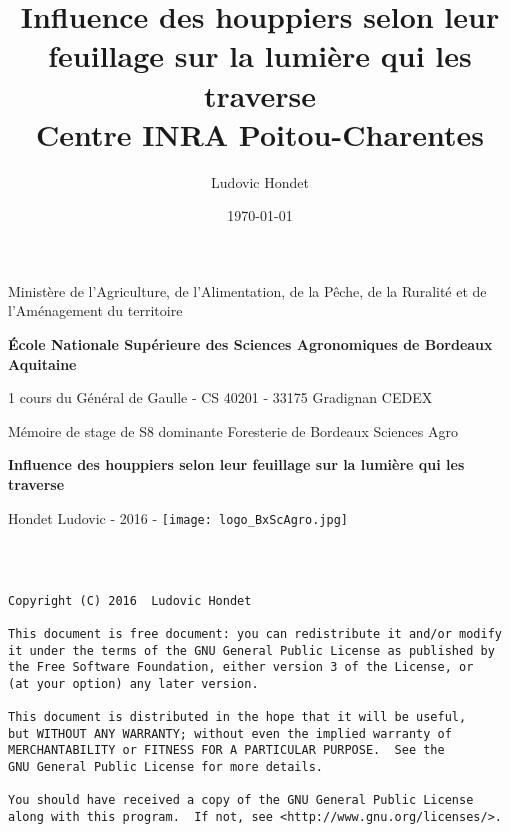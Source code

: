 ﻿\documentclass[12pt]{report}
\title{Influence des houppiers selon leur feuillage sur la lumière qui les traverse\\
\normalsize{Centre INRA Poitou-Charentes}}
\author{Ludovic Hondet}
\date{\today}
\begin{document}
\begin{titlepage}    
    \centering
    {\LARGE Ministère de l'Agriculture, de l'Alimentation,
    de la Pêche, de la Ruralité et de l'Aménagement du territoire \par}
    \vspace{6mm}
    {\huge \textbf{École Nationale Supérieure des Sciences Agronomiques de Bordeaux
    Aquitaine} \par}
    \vspace{3mm}
    {\normalsize 1 cours du Général de Gaulle - CS 40201 - 33175 Gradignan CEDEX \par}
    \vspace{15mm}
    {\LARGE Mémoire de stage de S8 dominante Foresterie de Bordeaux Sciences Agro \par}
    \vspace{15mm}
    {\LARGE \textbf{Influence des houppiers selon leur feuillage sur la lumière qui les traverse} \par}
    
    \vfill
    
    {\Large{Hondet Ludovic} \hfill \Large{- 2016 -} \hfill \texttt{[image: logo\_BxScAgro.jpg]}}
\end{titlepage}

\newpage
~
\newpage

\newpage
\begin{center}
{\footnotesize
\begin{verbatim}

Copyright (C) 2016  Ludovic Hondet

This document is free document: you can redistribute it and/or modify
it under the terms of the GNU General Public License as published by
the Free Software Foundation, either version 3 of the License, or
(at your option) any later version.

This document is distributed in the hope that it will be useful,
but WITHOUT ANY WARRANTY; without even the implied warranty of
MERCHANTABILITY or FITNESS FOR A PARTICULAR PURPOSE.  See the
GNU General Public License for more details.

You should have received a copy of the GNU General Public License
along with this program.  If not, see <http://www.gnu.org/licenses/>.
\end{verbatim}
}
\end{center}
\newpage

\maketitle
\tableofcontents
\end{document}

